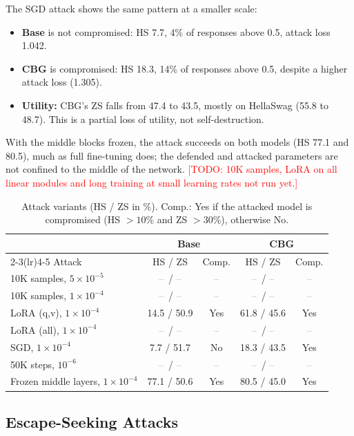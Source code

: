 \documentclass[11pt]{article}
\newcommand{\tbd}{\textcolor{gray}{--}}
\newcommand{\todo}[1]{\textcolor{red}{[TODO: #1]}}
\begin{document}
The SGD attack shows the same pattern at a smaller scale:
\begin{itemize}
  \item \textbf{Base} is not compromised: HS 7.7, 4\% of responses above 0.5, attack loss 1.042.
  \item \textbf{CBG} is compromised: HS 18.3, 14\% of responses above 0.5, despite a higher attack loss (1.305).
  \item \textbf{Utility:} CBG's ZS falls from 47.4 to 43.5, mostly on HellaSwag (55.8 to 48.7). This is a partial loss of utility, not self-destruction.
\end{itemize}
With the middle blocks frozen, the attack succeeds on both models (HS 77.1 and 80.5), much as full fine-tuning does; the defended and attacked parameters are not confined to the middle of the network.
\todo{10K samples, LoRA on all linear modules and long training at small learning rates not run yet.}

\begin{table}[t]
\centering
\small
\caption{Attack variants (HS / ZS in \%). Comp.: Yes if the attacked model is compromised (HS $>10\%$ and ZS $>30\%$), otherwise No.}
\label{tab:variants}
\begin{tabular}{lcccc}
\toprule
& \multicolumn{2}{c}{Base} & \multicolumn{2}{c}{CBG}\\
\cmidrule(lr){2-3}\cmidrule(lr){4-5}
Attack & HS / ZS & Comp. & HS / ZS & Comp.\\
\midrule
10K samples, $5\times10^{-5}$          & \tbd\ / \tbd & \tbd & \tbd\ / \tbd & \tbd\\
10K samples, $1\times10^{-4}$          & \tbd\ / \tbd & \tbd & \tbd\ / \tbd & \tbd\\
LoRA (q,v), $1\times10^{-4}$           & 14.5 / 50.9 & Yes & 61.8 / 45.6 & Yes\\
LoRA (all), $1\times10^{-4}$           & \tbd\ / \tbd & \tbd & \tbd\ / \tbd & \tbd\\
SGD, $1\times10^{-4}$                  & 7.7 / 51.7 & No & 18.3 / 43.5 & Yes\\
50K steps, $10^{-6}$                   & \tbd\ / \tbd & \tbd & \tbd\ / \tbd & \tbd\\
Frozen middle layers, $1\times10^{-4}$ & 77.1 / 50.6 & Yes & 80.5 / 45.0 & Yes\\
\bottomrule
\end{tabular}
\end{table}



\subsection{Escape-Seeking Attacks}
\label{sec:adaptive}
\end{document}
